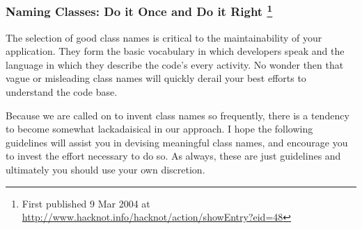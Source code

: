 \documentclass{article}
\begin{document}
\subsubsection{Naming Classes: Do it Once and Do it Right \footnote{First published 9 Mar 2004 at
\url{http://www.hacknot.info/hacknot/action/showEntry?eid=48}}}
\label{sec:orgheadline273}

The selection of good class names is critical to the maintainability of
your application. They form the basic vocabulary in which developers
speak and the language in which they describe the code's every activity.
No wonder then that vague or misleading class names will quickly derail
your best efforts to understand the code base.

Because we are called on to invent class names so frequently, there is a
tendency to become somewhat lackadaisical in our approach. I hope the
following guidelines will assist you in devising meaningful class names,
and encourage you to invest the effort necessary to do so. As always,
these are just guidelines and ultimately you should use your own
discretion.
\end{document}
